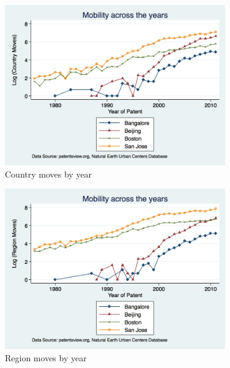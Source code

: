 \documentclass[12pt]{article}
\begin{document}
\newpage

\begin{figure}[h!]
\begin{centering}
  \includegraphics[width=0.85\textwidth]{countrymoves}
  \caption{Country moves by year}
   \label{fig:countrymoves}
\end{centering}
\end{figure}

\begin{figure}[h!]
\begin{centering}
  \includegraphics[width=0.85\textwidth]{regionmoves}
  \caption{Region moves by year}
   \label{fig:regionmoves}
\end{centering}
\end{figure}
\end{document}
